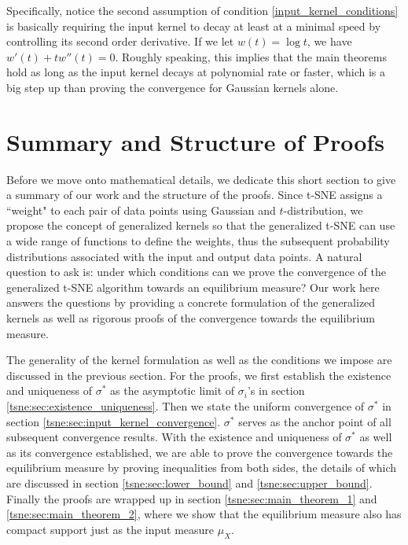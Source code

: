 Specifically, notice the second assumption of condition
\ref{input_kernel_conditions} is basically requiring the input kernel to decay
at least at a minimal speed by controlling its second order derivative. If we
let $w(t) = \log t$, we have $w'(t)+tw''(t) = 0$. Roughly speaking, this
implies that the main theorems hold as long as the input kernel decays at
polynomial rate or faster, which is a big step up than proving the convergence
for Gaussian kernels alone.
\section{Summary and Structure of Proofs} \label{tsne:sec:summary_structure}
Before we move onto mathematical details, we dedicate this short section to
give a summary of our work and the structure of the proofs. Since t-SNE assigns
a ``weight" to each pair of data points using Gaussian and $t$-distribution, we
propose the concept of generalized kernels so that the generalized t-SNE can
use a wide range of functions to define the weights, thus the subsequent
probability distributions associated with the input and output data points. A
natural question to ask is: under which conditions can we prove the convergence
of the generalized t-SNE algorithm towards an equilibrium measure? Our work
here answers the questions by providing a concrete formulation of the
generalized kernels as well as rigorous proofs of the convergence towards the
equilibrium measure.

The generality of the kernel formulation as well as the conditions we impose
are discussed in the previous section. For the proofs, we first establish the
existence and uniqueness of $\sigma^*$ as the asymptotic limit of $\sigma_i$'s
in section \ref{tsne:sec:existence_uniqueness}. Then we state the uniform
convergence of $\sigma^*$ in section \ref{tsne:sec:input_kernel_convergence}.
$\sigma^*$ serves as the anchor point of all subsequent convergence results.
With the existence and uniqueness of $\sigma^*$ as well as its convergence
established, we are able to prove the convergence towards the equilibrium
measure by proving inequalities from both sides, the details of which are
discussed in section \ref{tsne:sec:lower_bound} and \ref{tsne:sec:upper_bound}.
Finally the proofs are wrapped up in section \ref{tsne:sec:main_theorem_1} and
\ref{tsne:sec:main_theorem_2}, where we show that the equilibrium measure also has
compact support just as the input measure $\mu_X$.
